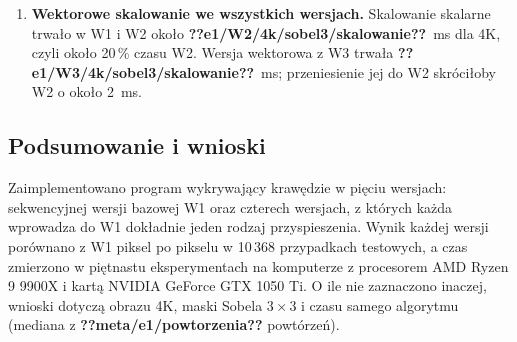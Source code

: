 \documentclass[12pt,a4paper]{article}
\providecommand{\wynik}[1]{\textbf{??#1??}}
\begin{document}
\begin{enumerate}
	\item \textbf{Wektorowe skalowanie we wszystkich wersjach.} Skalowanie skalarne trwało w W1 i W2 około \wynik{e1/W2/4k/sobel3/skalowanie}~ms dla 4K, czyli około 20\,\% czasu W2. Wersja wektorowa z W3 trwała \wynik{e1/W3/4k/sobel3/skalowanie}~ms; przeniesienie jej do W2 skróciłoby W2 o około 2~ms.
\end{enumerate}

\subsection{Podsumowanie i wnioski}

Zaimplementowano program wykrywający krawędzie w pięciu wersjach: sekwencyjnej wersji bazowej W1 oraz czterech wersjach, z których każda wprowadza do W1 dokładnie jeden rodzaj przyspieszenia. Wynik każdej wersji porównano z W1 piksel po pikselu w 10\,368 przypadkach testowych, a czas zmierzono w piętnastu eksperymentach na komputerze z procesorem AMD Ryzen 9 9900X i kartą NVIDIA GeForce GTX 1050 Ti. O ile nie zaznaczono inaczej, wnioski dotyczą obrazu 4K, maski Sobela $3\times3$ i czasu samego algorytmu (mediana z \wynik{meta/e1/powtorzenia} powtórzeń).
\end{document}
